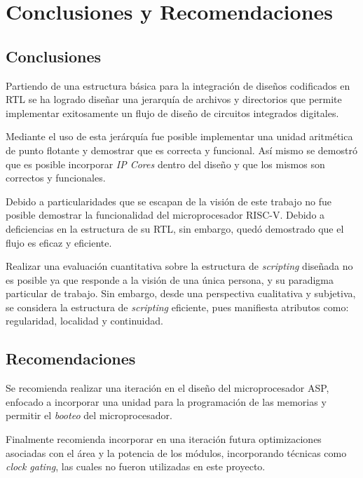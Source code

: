 \chapter{Conclusiones y Recomendaciones}

\section{Conclusiones}
Partiendo de una estructura básica para la integración de diseños codificados en RTL se ha logrado diseñar una jerarquía de archivos y directorios que permite implementar exitosamente un flujo de diseño de circuitos integrados digitales.

Mediante el uso de esta jerárquía fue posible implementar una unidad aritmética de punto flotante y demostrar que es correcta y funcional. Así mismo se demostró que es posible incorporar \textit{IP Cores} dentro del diseño y que los mismos son correctos y funcionales.

Debido a particularidades que se escapan de la visión de este trabajo no fue posible demostrar la funcionalidad del microprocesador RISC-V. Debido a deficiencias en la estructura de su RTL, sin embargo, quedó demostrado que el flujo es eficaz y eficiente.

Realizar una evaluación cuantitativa sobre la estructura de \textit{scripting} diseñada no es posible ya que responde a la visión de una única persona, y su paradigma particular de trabajo. Sin embargo, desde una perspectiva cualitativa y subjetiva, se considera la estructura de \textit{scripting} eficiente, pues manifiesta atributos como: regularidad, localidad y continuidad.

\section{Recomendaciones}

Se recomienda realizar una iteración en el diseño del microprocesador ASP, enfocado a incorporar una unidad para la programación de las memorias y permitir el \textit{booteo} del microprocesador.

Finalmente recomienda incorporar en una iteración futura optimizaciones asociadas con el área y la potencia de los módulos, incorporando técnicas como \textit{clock gating}, las cuales no fueron utilizadas en este proyecto.